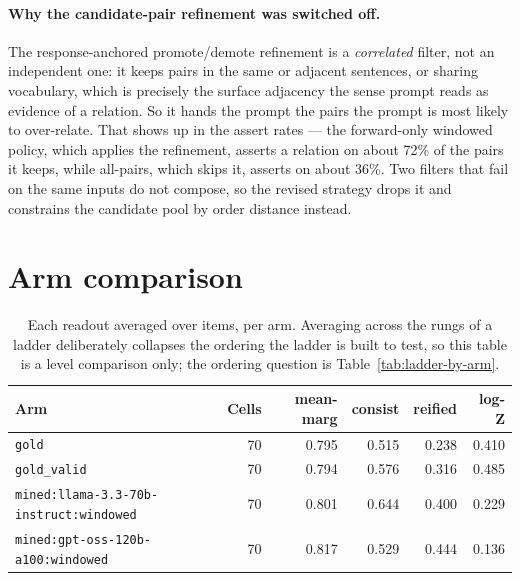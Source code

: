 \documentclass[11pt]{article}
\begin{document}
\paragraph{Why the candidate-pair refinement was switched off.} The response-anchored promote/demote refinement is a \emph{correlated} filter, not an independent one: it keeps pairs in the same or adjacent sentences, or sharing vocabulary, which is precisely the surface adjacency the sense prompt reads as evidence of a relation. So it hands the prompt the pairs the prompt is most likely to over-relate. That shows up in the assert rates --- the forward-only windowed policy, which applies the refinement, asserts a relation on about 72\% of the pairs it keeps, while all-pairs, which skips it, asserts on about 36\%. Two filters that fail on the same inputs do not compose, so the revised strategy drops it and constrains the candidate pool by order distance instead.

\section{Arm comparison}\label{sec:arms}

\begin{table}[htbp]
\centering
\small
\caption{Each readout averaged over items, per arm. Averaging across the rungs of a ladder deliberately collapses the ordering the ladder is built to test, so this table is a level comparison only; the ordering question is Table~\ref{tab:ladder-by-arm}.}
\label{tab:policy-lcs}
\begin{tabular}{lrrrrr}
\toprule
Arm & Cells & \textbf{mean-marg} & \textbf{consist} & \textbf{reified} & \textbf{log-Z} \\
\midrule
\texttt{gold} & 70 & 0.795 & 0.515 & 0.238 & 0.410 \\
\texttt{gold\_valid} & 70 & 0.794 & 0.576 & 0.316 & 0.485 \\
\texttt{mined:llama-3.3-70b-instruct:windowed} & 70 & 0.801 & 0.644 & 0.400 & 0.229 \\
\texttt{mined:gpt-oss-120b-a100:windowed} & 70 & 0.817 & 0.529 & 0.444 & 0.136 \\
\bottomrule
\end{tabular}
\end{table}
\end{document}
